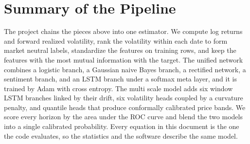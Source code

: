 \documentclass[12pt,letterpaper]{article}
\begin{document}
\clearpage
\section{Summary of the Pipeline}

The project chains the pieces above into one estimator. We compute log returns
and forward realized volatility, rank the volatility within each date to form
market neutral labels, standardize the features on training rows, and keep the
features with the most mutual information with the target. The unified network
combines a logistic branch, a Gaussian naive Bayes branch, a rectified network,
a sentiment branch, and an LSTM branch under a softmax meta layer, and it is
trained by Adam with cross entropy. The multi scale model adds six window LSTM
branches linked by their drift, six volatility heads coupled by a curvature
penalty, and quantile heads that produce conformally calibrated price bands. We
score every horizon by the area under the ROC curve and blend the two models
into a single calibrated probability. Every equation in this document is the one
the code evaluates, so the statistics and the software describe the same model.
\end{document}
